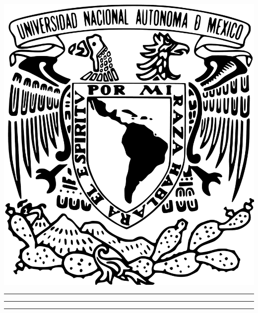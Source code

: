 \thispagestyle{empty}
\noindent
\begin{minipage}[][\textheight][c]{0.3\textwidth}
  \centering

  \includegraphics[height=0.2\textheight]{assets/unam.pdf}
  \vspace{5pt}
  \vfill
  \rule{0.5pt}{0.6\textheight}
  \hspace{7pt}
  \rule{2pt}{0.6\textheight}
  \hspace{7pt}
  \rule{.5pt}{0.6\textheight}
  \vspace{5pt}


\end{minipage}
